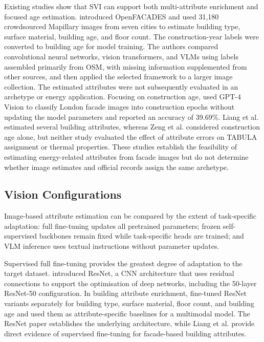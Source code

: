 Existing studies show that \ac{SVI} can support both multi-attribute enrichment and focused age estimation. \textcite{liang2025} introduced OpenFACADES and used 31,180 crowdsourced Mapillary images from seven cities to estimate building type, surface material, building age, and floor count. The construction-year labels were converted to building age for model training. The authors compared convolutional neural networks, vision transformers, and \acp{VLM} using labels assembled primarily from \ac{OSM}, with missing information supplemented from other sources, and then applied the selected framework to a larger image collection. The estimated attributes were not subsequently evaluated in an archetype or energy application. Focusing on construction age, \textcite{zeng2024} used GPT-4 Vision to classify London facade images into construction epochs without updating the model parameters and reported an accuracy of 39.69\%. Liang et al. estimated several building attributes, whereas Zeng et al. considered construction age alone, but neither study evaluated the effect of attribute errors on \ac{TABULA} assignment or thermal properties. These studies establish the feasibility of estimating energy-related attributes from facade images but do not determine whether image estimates and official records assign the same archetype.

\subsection{Vision Configurations}
\label{sec:image_model_configurations}

Image-based attribute estimation can be compared by the extent of task-specific adaptation: full fine-tuning updates all pretrained parameters; frozen self-supervised backbones remain fixed while task-specific heads are trained; and \ac{VLM} inference uses textual instructions without parameter updates.

Supervised full fine-tuning provides the greatest degree of adaptation to the target dataset. \textcite{he2016} introduced ResNet, a \acf{CNN} architecture that uses residual connections to support the optimisation of deep networks, including the 50-layer ResNet-50 configuration. In building attribute enrichment, \textcite{liang2025} fine-tuned ResNet variants separately for building type, surface material, floor count, and building age and used them as attribute-specific baselines for a multimodal model. The ResNet paper establishes the underlying architecture, while Liang et al. provide direct evidence of supervised fine-tuning for facade-based building attributes.

